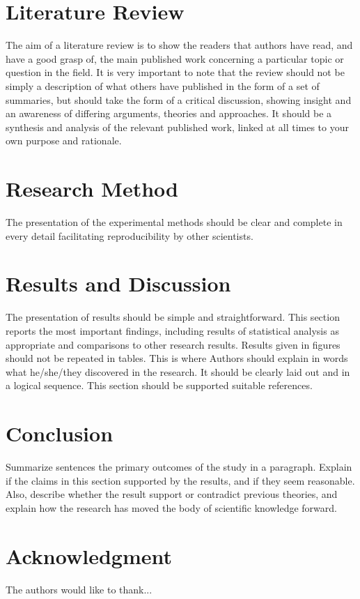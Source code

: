 \documentclass[]{indojc}
\begin{document}
\section{Literature Review}
The aim of a literature review is to show the readers that authors have read, and have a good grasp of, the main published work concerning a particular topic or question in the field. It is very important to note that the review should not be simply a description of what others have published in the form of a set of summaries, but should take the form of a critical discussion, showing insight and an awareness of differing arguments, theories and approaches. It should be a synthesis and analysis of the relevant published work, linked at all times to your own purpose and rationale.

\section{Research Method}
The presentation of the experimental methods should be clear and complete in every detail facilitating reproducibility by other scientists.

\section{Results and Discussion}
The presentation of results should be simple and straightforward. This section reports the most important findings, including results of statistical analysis as appropriate and comparisons to other research results. Results given in figures should not be repeated in tables. This is where Authors should explain in words what he/she/they discovered in the research. It should be clearly laid out and in a logical sequence. This section should be supported suitable references.

\section{Conclusion}
Summarize sentences the primary outcomes of the study in a paragraph. Explain if the claims in this section supported by the results, and if they seem reasonable. Also, describe whether the result support or contradict previous theories, and explain how the research has moved the body of scientific knowledge forward. 

\section*{Acknowledgment}
The authors would like to thank...
\end{document}
